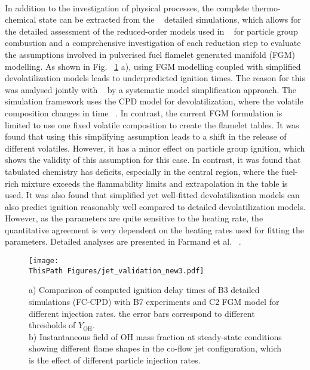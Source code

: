 \begin{btUnit}
\\
In addition to the investigation of physical processes, the complete thermo-chemical state can be extracted from the ~ detailed simulations, which allows for the detailed assessment of the reduced-order models used in ~ for particle group combustion and a comprehensive investigation of each reduction step to evaluate the assumptions involved in pulverised fuel flamelet generated manifold (FGM) modelling. As shown in Fig. ~\ref{fig:B3TurbulenceValidation} a), using FGM modelling coupled with simplified devolatilization models leads to underpredicted ignition times. The reason for this was analysed jointly with ~ by a systematic model simplification approach. The ~ simulation framework uses the CPD model for devolatilization, where the volatile composition changes in time ~\cite{Farazi2019a}. In contrast, the current FGM formulation is limited to use one fixed volatile composition to create the flamelet tables. It was found that using this simplifying assumption leads to a shift in the release of different volatiles. However, it has a minor effect on particle group ignition, which shows the validity of this assumption for this case. In contrast, it was found that tabulated chemistry has deficits, especially in the central region, where the fuel-rich mixture exceeds the flammability limits and extrapolation in the table is used. It was also found that simplified yet well-fitted devolatilization models can also predict ignition reasonably well compared to detailed devolatilization models. However, as the parameters are quite sensitive to the heating rate, the quantitative agreement is very dependent on the heating rates used for fitting the parameters. Detailed analyses are presented in Farmand et al. ~\cite{Farmand2022}.
\begin{figure}
	\texttt{[image: \\ThisPath Figures/jet\_validation\_new3.pdf]}
	\caption{a) Comparison of computed ignition delay times of B3 detailed simulations (FC-CPD) with B7 experiments and C2 FGM model for different injection rates. the error bars correspond to different thresholds of $Y_\mathrm{OH}$.\\b) Instantaneous field of OH mass fraction at steady-state conditions showing different flame shapes in the co-flow jet configuration, which is the effect of different particle injection rates.}\label{fig:B3TurbulenceValidation}
\end{figure}




\end{btUnit}
